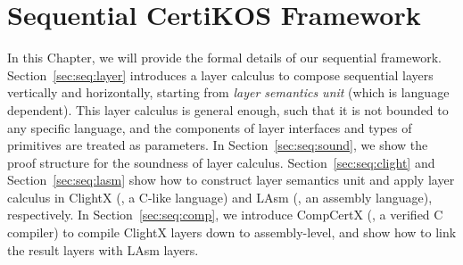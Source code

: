 \chapter{Sequential CertiKOS Framework}
\label{chap:seq}
In this Chapter, we will provide the formal details
of our sequential \CTOS{} framework.
Section~\ref{sec:seq:layer} introduces
a layer calculus to compose
sequential layers vertically and
horizontally, starting from \emph{layer semantics unit}
(which is language dependent).
This layer calculus is general enough,
such that it is not bounded to any specific language,
and the components of layer interfaces
and types of primitives are treated as parameters. 
In Section~\ref{sec:seq:sound},
we show the proof structure for the soundness of layer calculus.
Section~\ref{sec:seq:clight}
and Section~\ref{sec:seq:lasm}
show how to construct layer semantics unit
and apply layer calculus
in ClightX (\ie, a C-like language) and LAsm (\ie, an assembly language), respectively.
In Section~\ref{sec:seq:comp},
we introduce CompCertX (\ie, a verified C compiler)
to compile ClightX layers down to assembly-level,
and show how to link the result layers with
LAsm layers.




